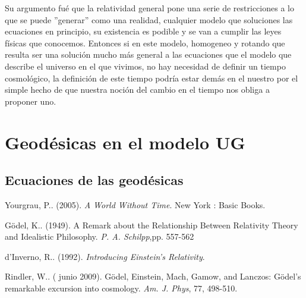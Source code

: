 \documentclass[11pt]{book}
\begin{document}
Su argumento fué que la relatividad general pone una serie de restricciones a lo que se puede ''generar'' como una realidad, cualquier modelo que soluciones las ecuaciones en principio, su existencia es podible y se van a cumplir las leyes físicas que conocemos. Entonces si en este modelo, homogeneo y rotando que resulta ser una solución mucho más general a las ecuaciones que el modelo que describe el universo en el que vivimos, no hay necesidad de definir un tiempo cosmológico, la definición de este tiempo podría estar demás en el nuestro por el simple hecho de que nuestra noción del cambio en el tiempo nos obliga a proponer uno.

\chapter{Geodésicas en el modelo UG}

\section{Ecuaciones de las geodésicas}











 \begin{thebibliography}{99}
  Yourgrau, P.. (2005). \emph{A World Without Time}. New York %
 : Basic Books.
 
  Gödel, K.. (1949). A Remark about the Relationship Between Relativity Theory and Idealistic Philosophy. \emph{P. A. Schilpp},pp. 557-562
 
  d'Inverno, R.. (1992). \emph{Introducing Einstein's Relativity}. 
 
  Rindler, W.. ( junio 2009). Gödel, Einstein, Mach, Gamow, and Lanczos: Gödel’s remarkable excursion into cosmology. \emph{Am. J. Phys}, 77, 498-510.
 
 
 \end{thebibliography}
 
\end{document}
